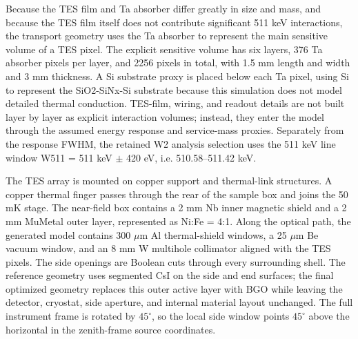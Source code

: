 \documentclass[11pt]{article}
\begin{document}
Because the TES film and Ta absorber differ greatly in size and mass, and because the TES film itself does not contribute significant 511 keV interactions, the transport geometry uses the Ta absorber to represent the main sensitive volume of a TES pixel. The explicit sensitive volume has six layers, 376 Ta absorber pixels per layer, and 2256 pixels in total, with 1.5 mm length and width and 3 mm thickness. A Si substrate proxy is placed below each Ta pixel, using Si to represent the SiO2-SiNx-Si substrate because this simulation does not model detailed thermal conduction. TES-film, wiring, and readout details are not built layer by layer as explicit interaction volumes; instead, they enter the model through the assumed energy response and service-mass proxies. Separately from the response FWHM, the retained W2 analysis selection uses the 511 keV line window W511 = 511 keV $\pm$ 420 eV, i.e. 510.58--511.42 keV.

The TES array is mounted on copper support and thermal-link structures. A copper
thermal finger passes through the rear of the sample box and joins the 50 mK
stage. The near-field box contains a 2 mm Nb inner magnetic shield and a 2 mm
MuMetal outer layer, represented as Ni:Fe = 4:1. Along the optical path, the
generated model contains 300 $\mu$m Al thermal-shield windows, a 25 $\mu$m Be
vacuum window, and an 8 mm W multihole collimator aligned with the TES pixels.
The side openings are Boolean cuts through every surrounding shell. The
reference geometry uses segmented CsI on the side and end surfaces; the
final optimized geometry replaces this outer active layer with BGO while leaving
the detector, cryostat, side aperture, and internal material layout unchanged.
The full instrument frame is rotated by $45^\circ$, so the local side window
points $45^\circ$ above the horizontal in the zenith-frame source coordinates.
\end{document}
